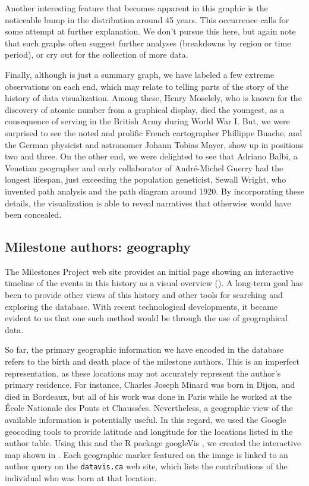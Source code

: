 Another interesting feature that becomes apparent in this graphic is the noticeable bump in the distribution around 45 years. This occurrence calls for some attempt at further explanation. We don't pursue this here, but again note that such graphs often suggest further analyses (breakdowns by region or time period), or cry out for the collection of more data.

Finally, although  is just a summary graph, we have labeled a few extreme observations on each end, which may relate to telling parts of the story of the history of data visualization.  Among these, Henry Moselely, who is known for the discovery of atomic number from a graphical display, died the youngest, as a consequence of serving in the British Army during World War I. But, we were surprised to see the noted and prolific French cartographer Phillippe Buache, and the German physicist and astronomer Johann Tobias Mayer, show up in positions two and three.  On the other end, we were delighted to see that Adriano Balbi, a Venetian geographer and early collaborator of Andr{\'e}-Michel Guerry \citep{BalbiGuerry:1829} had the longest lifespan, just exceeding the population geneticist, Sewall Wright, who invented path analysis and the path diagram around 1920.  By incorporating these details, the visualization is able to reveal narratives that otherwise would have been concealed.

\subsection{Milestone authors: geography}\label{sec:geography}
The Milestones Project web site provides an initial page showing an interactive timeline of the events in this history as a visual overview (). A long-term goal has been to provide other views of this history and other tools for searching and exploring the database. With recent technological developments, it became evident to us that one such method would be through the use of geographical data.

So far, the primary geographic information we have encoded in the database refers to the birth and death place of the milestone authors. This is an imperfect representation, as these locations may not accurately represent the author's primary residence.  For instance, Charles Joseph Minard was born in Dijon, and died in Bordeaux, but all of his work was done in Paris while he worked at the {\'E}cole Nationale des Ponts et Chauss{\'e}es. Nevertheless, a geographic view of the available information is potentially useful. In this regard, we used the Google geocoding tools to provide latitude and longitude for the locations listed in the author table.  Using this and the R package googleVis \citep{googleVis}, we created the interactive map shown in .  Each geographic marker featured on the image is linked to an author query on the \texttt{datavis.ca} web site, which lists the contributions of the individual who was born at that location.

